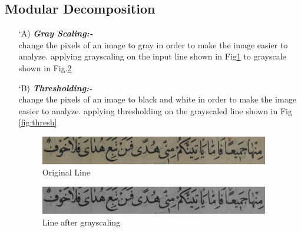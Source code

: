 \subsection{Modular Decomposition}

\begin{itemize}[labelindent=1em,labelsep=0.25cm,leftmargin=*]

     \item[\char `A)] \textit{\textbf{Gray Scaling:- }} \\ 
        change the pixels of an image to gray in order to  make the image easier to analyze.
        applying grayscaling on the input line shown
        in Fig\ref{fig:origin}  to grayscale shown in Fig.\ref{fig:gray}
        
        \item[\char `B)] \textit{\textbf{Thresholding:- }} \\ 
        change the pixels of an image to black and white in order to  make the image easier to analyze.
        applying thresholding on the grayscaled line shown in Fig \ref{fig:thresh}
        
         \begin{figure}[H]
        \centering
        \includegraphics[width=10cm]{images/origin.png}
        \caption{Original Line}
        \label{fig:origin}
        \end{figure}
        
         \begin{figure}[H]
        \centering
        \includegraphics[width=10cm]{images/gray.png}
        \caption{Line after grayscaling}
        \label{fig:gray}
        \end{figure}
        

\end{itemize}
